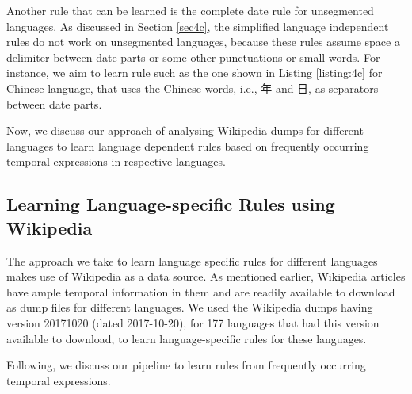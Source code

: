 Another rule that can be learned is the complete date rule for unsegmented languages. As discussed in Section \ref{sec4c}, the simplified language independent rules do not work on unsegmented languages, because these rules assume space a delimiter between date parts or some other punctuations or small words. For instance, we aim to learn rule such as the one shown in Listing \ref{listing:4c} for Chinese language, that uses the Chinese words, i.e., 年 and 日, as separators between date parts. 

Now, we discuss our approach of analysing Wikipedia dumps for different languages to learn language dependent rules based on frequently occurring temporal expressions in respective languages. 

\subsection{Learning Language-specific Rules using Wikipedia}
The approach we take to learn language specific rules for different languages makes use of Wikipedia as a data source. As mentioned earlier, Wikipedia articles have ample temporal information in them and are readily available to download as dump files for different languages. We used the Wikipedia dumps having version 20171020 (dated 2017-10-20), for 177 languages that had this version available to download, to learn language-specific rules for these languages.

Following, we discuss our pipeline to learn rules from frequently occurring temporal expressions. 

